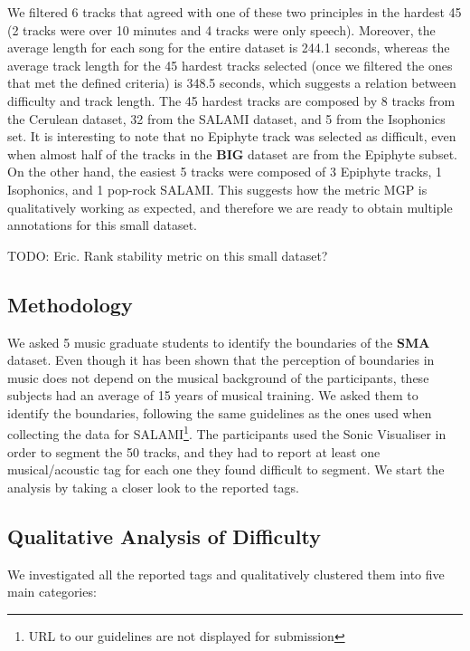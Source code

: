 \documentclass{article}
\begin{document}
We filtered 6 tracks that agreed with one of these two principles in the hardest 45 (2 tracks were over 10 minutes and 4 tracks were only speech). 
Moreover, the average length for each song for the entire dataset is 244.1 seconds, whereas the average track length for the 45 hardest tracks selected (once we filtered the ones that met the defined criteria) is 348.5 seconds, which suggests a relation between difficulty and track length.
The 45 hardest tracks are composed by 8 tracks from the Cerulean dataset, 32 from the SALAMI dataset, and 5 from the Isophonics set.
It is interesting to note that no Epiphyte track was selected as difficult, even when almost half of the tracks in the \textbf{BIG} dataset are from the Epiphyte subset.
On the other hand, the easiest 5 tracks were composed of 3 Epiphyte tracks, 1 Isophonics, and 1 pop-rock SALAMI.
This suggests how the metric MGP is qualitatively working as expected, and therefore we are ready to obtain multiple annotations for this small dataset.

TODO: Eric. Rank stability metric on this small dataset?

\subsection{Methodology}

We asked 5 music graduate students to identify the boundaries of the \textbf{SMA} dataset.
Even though it has been shown that the perception of boundaries in music does not depend on the musical background of the participants\cite{Bruderer2009}, these subjects had an average of 15 years of musical training.
We asked them to identify the boundaries, following the same guidelines as the ones used when collecting the data for SALAMI\cite{Smith2011}\footnote{URL to our guidelines are not displayed for submission}.
The participants used the Sonic Visualiser\cite{Cannam2006} in order to segment the 50 tracks, and they had to report at least one musical/acoustic tag for each one they found difficult to segment.
We start the analysis by taking a closer look to the reported tags.

\subsection{Qualitative Analysis of Difficulty}

We investigated all the reported tags and qualitatively clustered them into five main categories:
\end{document}
